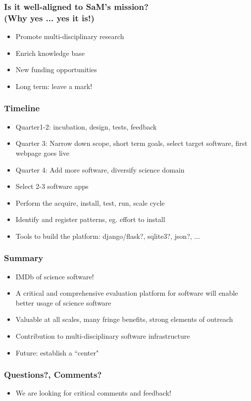 \documentclass[hyperref={pdfpagelabels=false},12pt]{beamer}
\begin{document}
\begin{frame}
\frametitle{Is it well-aligned to SaM's mission? \\ (Why yes ... yes it is!)}
\begin{itemize}
\itemsep1em
\item 
Promote multi-disciplinary research
\item
Enrich knowledge base
\item
New funding opportunities
\item
Long term: leave a mark!
\end{itemize}
\end{frame}

\begin{frame}
\frametitle{Timeline}
\begin{itemize}
\itemsep1em
\item 
Quarter1-2: incubation, design, tests, feedback
\item
Quarter 3: Narrow down scope, short term goals, select target software, first webpage goes live
\item
Quarter 4: Add more software, diversify science domain
\item
Select 2-3 software apps
\item
Perform the acquire, install, test, run, scale cycle
\item
Identify and register patterns, eg. effort to install
\item
Tools to build the platform: django/flask?, sqlite3?, json?, ...
\end{itemize}
\end{frame}

\begin{frame}
\frametitle{Summary}
\begin{itemize}
\itemsep1em
\item IMDb of science software!
\item
A critical and comprehensive evaluation platform for software will enable better usage of science software
\item
Valuable at all scales, many fringe benefits, strong elements of outreach
\item
Contribution to multi-disciplinary software infrastructure
\item
Future: establish a ``center"
\end{itemize}
\end{frame}

\begin{frame}
\frametitle{Questions?, Comments?}
\begin{itemize}
\item We are looking for critical comments and feedback!
\end{itemize}
\end{frame}
\end{document}
